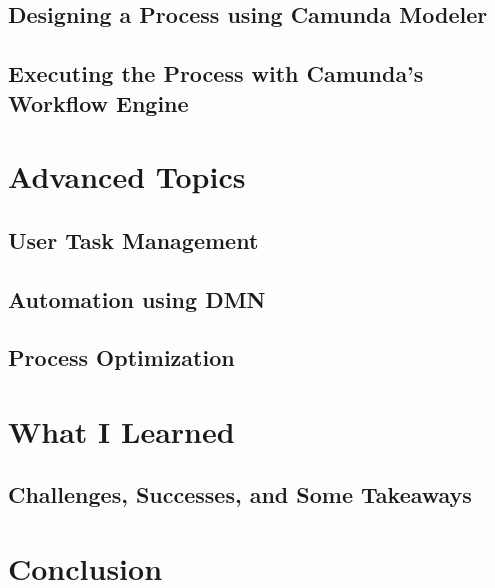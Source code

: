 \documentclass[12pt]{article}
\begin{document}
{  \subsection{Designing a Process using Camunda Modeler}
  \subsection{Executing the Process with Camunda's Workflow Engine}

\pagebreak

\section{Advanced Topics}
  \subsection{User Task Management}
  \subsection{Automation using DMN}
  \subsection{Process Optimization}

\pagebreak

\section{What I Learned}
  \subsection{Challenges, Successes, and Some Takeaways}

\pagebreak

\section{Conclusion}

}

\printbibliography
\end{document}
